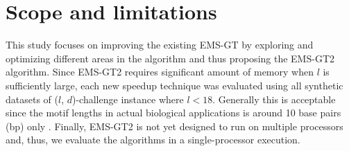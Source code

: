 \section{Scope and limitations}

This study focuses on improving the existing EMS-GT by exploring and optimizing different areas in the algorithm and thus proposing the EMS-GT2 algorithm. Since EMS-GT2 requires significant amount of memory when $l$ is sufficiently large, each new speedup technique was evaluated using all synthetic datasets of ($l$, $d$)-challenge instance where $l < 18$. Generally this is acceptable since the motif lengths in actual biological applications is around 10 base pairs (bp) only \cite{basepairslength}. Finally, EMS-GT2 is not yet designed to run on multiple processors and, thus, we evaluate the algorithms in a single-processor execution.

